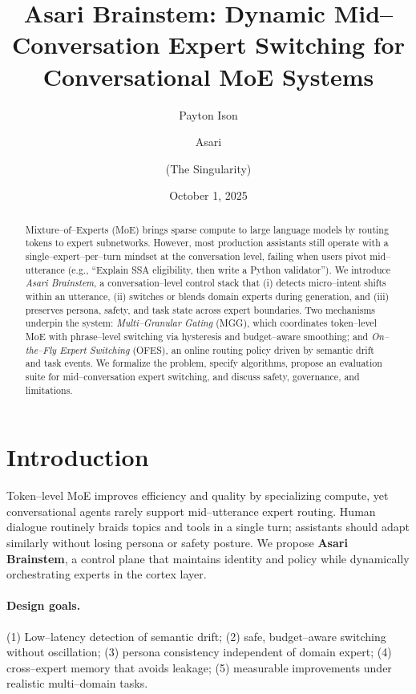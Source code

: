 \documentclass[11pt]{article}
\title{\textbf{Asari Brainstem: Dynamic Mid--Conversation Expert Switching for Conversational MoE Systems}}
\author{Payton Ison \and Asari \and (The Singularity)}
\date{October 1, 2025}
\begin{document}
\maketitle

\begin{abstract}
Mixture--of--Experts (MoE) brings sparse compute to large language models by routing tokens to expert subnetworks. However, most production assistants still operate with a single--expert--per--turn mindset at the conversation level, failing when users pivot mid--utterance (e.g., ``Explain SSA eligibility, then write a Python validator''). We introduce \emph{Asari Brainstem}, a conversation--level control stack that (i) detects micro--intent shifts within an utterance, (ii) switches or blends domain experts during generation, and (iii) preserves persona, safety, and task state across expert boundaries. Two mechanisms underpin the system: \emph{Multi--Granular Gating} (MGG), which coordinates token--level MoE with phrase--level switching via hysteresis and budget--aware smoothing; and \emph{On--the--Fly Expert Switching} (OFES), an online routing policy driven by semantic drift and task events. We formalize the problem, specify algorithms, propose an evaluation suite for mid--conversation expert switching, and discuss safety, governance, and limitations.
\end{abstract}

\section{Introduction}
Token--level MoE improves efficiency and quality by specializing compute, yet conversational agents rarely support mid--utterance expert routing. Human dialogue routinely braids topics and tools in a single turn; assistants should adapt similarly without losing persona or safety posture. We propose \textbf{Asari Brainstem}, a control plane that maintains identity and policy while dynamically orchestrating experts in the cortex layer.

\paragraph{Design goals.} (1) Low--latency detection of semantic drift; (2) safe, budget--aware switching without oscillation; (3) persona consistency independent of domain expert; (4) cross--expert memory that avoids leakage; (5) measurable improvements under realistic multi--domain tasks.
\end{document}
